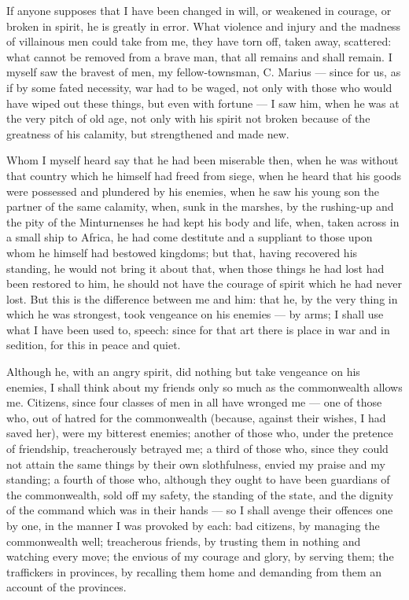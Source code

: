  If anyone supposes that I have been changed in will, or weakened in courage, or broken in spirit, he is greatly in error. What violence and injury and the madness of villainous men could take from me, they have torn off, taken away, scattered: what cannot be removed from a brave man, that all remains and shall remain. I myself saw the bravest of men, my fellow-townsman, C. Marius --- since for us, as if by some fated necessity, war had to be waged, not only with those who would have wiped out these things, but even with fortune --- I saw him, when he was at the very pitch of old age, not only with his spirit not broken because of the greatness of his calamity, but strengthened and made new.

 Whom I myself heard say that he had been miserable then, when he was without that country which he himself had freed from siege, when he heard that his goods were possessed and plundered by his enemies, when he saw his young son the partner of the same calamity, when, sunk in the marshes, by the rushing-up and the pity of the Minturnenses he had kept his body and life, when, taken across in a small ship to Africa, he had come destitute and a suppliant to those upon whom he himself had bestowed kingdoms; but that, having recovered his standing, he would not bring it about that, when those things he had lost had been restored to him, he should not have the courage of spirit which he had never lost. But this is the difference between me and him: that he, by the very thing in which he was strongest, took vengeance on his enemies --- by arms; I shall use what I have been used to, speech: since for that art there is place in war and in sedition, for this in peace and quiet.

 Although he, with an angry spirit, did nothing but take vengeance on his enemies, I shall think about my friends only so much as the commonwealth allows me. Citizens, since four classes of men in all have wronged me --- one of those who, out of hatred for the commonwealth (because, against their wishes, I had saved her), were my bitterest enemies; another of those who, under the pretence of friendship, treacherously betrayed me; a third of those who, since they could not attain the same things by their own slothfulness, envied my praise and my standing; a fourth of those who, although they ought to have been guardians of the commonwealth, sold off my safety, the standing of the state, and the dignity of the command which was in their hands --- so I shall avenge their offences one by one, in the manner I was provoked by each: bad citizens, by managing the commonwealth well; treacherous friends, by trusting them in nothing and watching every move; the envious of my courage and glory, by serving them; the traffickers in provinces, by recalling them home and demanding from them an account of the provinces.

